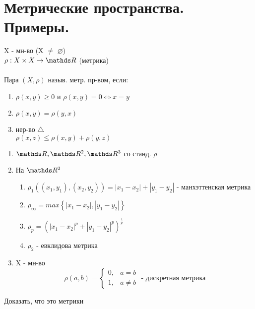 \documentclass[geometry.tex]{subfiles}
\begin{document}
  \section{Метрические пространства. Примеры.}

  \begin{definition}
      X - мн-во (X $\neq$ $\varnothing$) \\
      $\rho: X \times X \rightarrow \R$ (метрика)\\ \\
      Пара $(X, \rho)$ назыв. метр. пр-вом, если:
      \begin{enumerate}
          \item $\rho(x, y) \geq 0$ и $\rho(x, y) = 0 \Leftrightarrow x = y$
          \item $\rho(x, y) = \rho(y, x)$
          \item нер-во $\bigtriangleup$ \\ $\rho(x, z) \leq \rho(x, y) + \rho(y, z)$
      \end{enumerate}
  \end{definition}

  \begin{examples}
      \begin{enumerate}
          \item $\R, \R^2, \R^3$ со станд. $\rho$
          \item На $\R^2$
          \begin{enumerate}
            \item $\rho_1((x_1, y_1), (x_2, y_2)) = |x_1 - x_2| + |y_1 - y_2|$ - манхэттенская метрика
            \item $\rho_\infty = max\left\{|x_1 - x_2|, |y_1 - y_2|\right\}$
            \item $\rho_p = (|x_1 - x_2|^p + |y_1 - y_2|^p)^{\frac{1}{p}}$
            \item $\rho_2 \text{ - евклидова метрика}$
          \end{enumerate}
          \item X - мн-во\\
              \[\rho(a, b) =  \begin{cases}
                      0, &a = b\\
                      1, &a \neq b
                          \end{cases}\text{ - дискретная метрика}\]
      \end{enumerate}
  \end{examples}

  \begin{upr}
    Доказать, что это метрики
  \end{upr}
\end{document}
